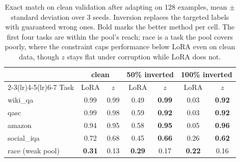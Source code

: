 \documentclass[10pt]{article}
\begin{document}
\begin{table}[t]
  \centering
  \caption{Exact match on clean validation after adapting on 128 examples,
  mean $\pm$ standard deviation over 3 seeds. Inversion replaces the targeted
  labels with guaranteed wrong ones. Bold marks the better method per cell.
  The first four tasks are within the pool's reach; race is a task the pool
  covers poorly, where the constraint caps performance below LoRA even on clean
  data, though $z$ stays flat under corruption while LoRA does not.}
  \label{tab:inversion}
  \small
  \begin{tabular}{lcccccc}
    \toprule
    & \multicolumn{2}{c}{clean} & \multicolumn{2}{c}{50\% inverted}
    & \multicolumn{2}{c}{100\% inverted} \\
    \cmidrule(lr){2-3}\cmidrule(lr){4-5}\cmidrule(lr){6-7}
    Task & LoRA & $z$ & LoRA & $z$ & LoRA & $z$ \\
    \midrule
    wiki\_qa      & 0.99 & 0.99 & 0.49 & \textbf{0.99} & 0.03 & \textbf{0.92} \\
    qasc          & 0.99 & 0.98 & 0.59 & \textbf{0.92} & 0.03 & \textbf{0.92} \\
    amazon        & 0.94 & 0.95 & 0.58 & \textbf{0.95} & 0.05 & \textbf{0.96} \\
    social\_iqa   & 0.72 & 0.68 & 0.45 & \textbf{0.66} & 0.26 & \textbf{0.62} \\
    \midrule
    race (weak pool) & \textbf{0.31} & 0.13 & \textbf{0.29} & 0.17 & \textbf{0.22} & 0.16 \\
    \bottomrule
  \end{tabular}
\end{table}
\end{document}
